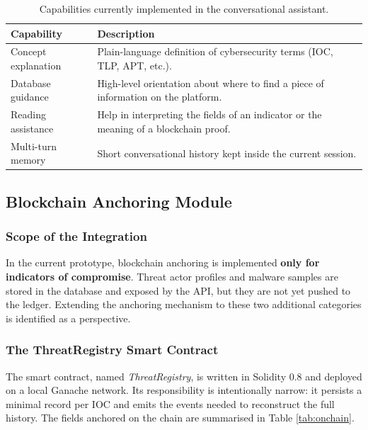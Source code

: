 \documentclass[12pt,a4paper,oneside]{book}
\begin{document}
{{\begin{table}[!h]
\caption{Capabilities currently implemented in the conversational assistant.}
\label{tab:chat}
\centering
\renewcommand{\arraystretch}{1.4}
\begin{tabular}{| C{.25\textwidth} | p{.65\textwidth} |}
\hline
\textbf{Capability} & \textbf{Description} \\
\hline\hline
Concept explanation & \nohyphens{Plain-language definition of cybersecurity terms (IOC, TLP, APT, etc.).} \\
\hline
Database guidance & \nohyphens{High-level orientation about where to find a piece of information on the platform.} \\
\hline
Reading assistance & \nohyphens{Help in interpreting the fields of an indicator or the meaning of a blockchain proof.} \\
\hline
Multi-turn memory & \nohyphens{Short conversational history kept inside the current session.} \\
\hline
\end{tabular}
\end{table}

\subsection{Blockchain Anchoring Module}

\subsubsection{Scope of the Integration}
In the current prototype, blockchain anchoring is implemented \textbf{only
for indicators of compromise}. Threat actor profiles and malware samples
are stored in the database and exposed by the API, but they are not yet
pushed to the ledger. Extending the anchoring mechanism to these two
additional categories is identified as a perspective.

\subsubsection{The ThreatRegistry Smart Contract}
The smart contract, named \textit{ThreatRegistry}, is written in Solidity
0.8 and deployed on a local Ganache network. Its responsibility is
intentionally narrow: it persists a minimal record per IOC and emits the
events needed to reconstruct the full history. The fields anchored on the
chain are summarised in Table \ref{tab:onchain}.

}}
\end{document}
